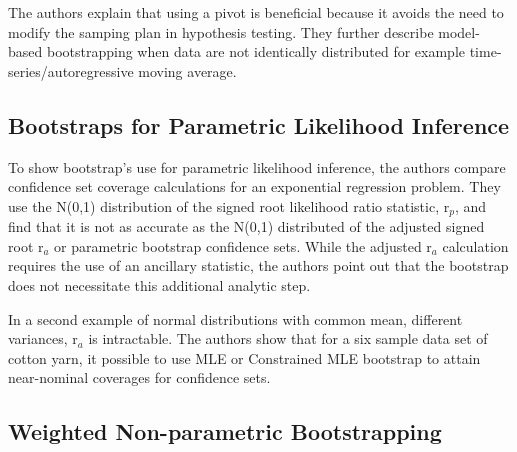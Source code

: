 \documentclass[11pt]{article}
\begin{document}
The authors explain that using a pivot is beneficial because it 
avoids the need to modify the samping plan in hypothesis testing.
They further describe model-based bootstrapping when data are not
identically distributed for example time-series/autoregressive moving average.
\subsection{Bootstraps for Parametric Likelihood Inference}
\label{sec-1-3}


To show bootstrap's use for parametric likelihood
inference, the authors compare confidence set coverage calculations 
for an exponential regression problem. They use the N(0,1)
distribution of the signed root likelihood ratio statistic, r$_p$, and
find that it is not as accurate as the N(0,1) distributed of the
adjusted signed root r$_a$ or parametric bootstrap confidence sets. While the
adjusted r$_a$ calculation requires the use of an ancillary statistic,
the authors point out that the bootstrap does not necessitate this
additional analytic step.
 
In a second example of normal distributions with common mean,
different variances, r$_a$ is intractable. The authors show that for a
six sample data set of cotton yarn, it possible to use MLE or
Constrained MLE bootstrap to attain near-nominal coverages for
confidence sets.
\subsection{Weighted Non-parametric Bootstrapping}
\label{sec-1-4}
\end{document}
